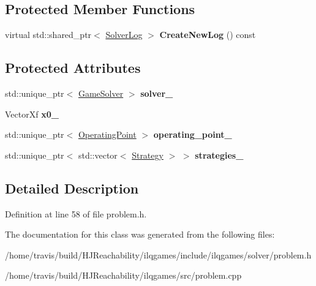 \subsection*{Protected Member Functions}
\begin{DoxyCompactItemize}
\item 
virtual std\+::shared\+\_\+ptr$<$ \hyperlink{classilqgames_1_1_solver_log}{Solver\+Log} $>$ {\bfseries Create\+New\+Log} () const \hypertarget{classilqgames_1_1_problem_a13d87495e055335f3da703909c435217}{}\label{classilqgames_1_1_problem_a13d87495e055335f3da703909c435217}

\end{DoxyCompactItemize}
\subsection*{Protected Attributes}
\begin{DoxyCompactItemize}
\item 
std\+::unique\+\_\+ptr$<$ \hyperlink{classilqgames_1_1_game_solver}{Game\+Solver} $>$ {\bfseries solver\+\_\+}\hypertarget{classilqgames_1_1_problem_aa14af0e2e063c99eefefd029d69dbf0d}{}\label{classilqgames_1_1_problem_aa14af0e2e063c99eefefd029d69dbf0d}

\item 
Vector\+Xf {\bfseries x0\+\_\+}\hypertarget{classilqgames_1_1_problem_a41236f0dfbc5eb6b1ddd08a5cc6555b3}{}\label{classilqgames_1_1_problem_a41236f0dfbc5eb6b1ddd08a5cc6555b3}

\item 
std\+::unique\+\_\+ptr$<$ \hyperlink{structilqgames_1_1_operating_point}{Operating\+Point} $>$ {\bfseries operating\+\_\+point\+\_\+}\hypertarget{classilqgames_1_1_problem_a2bb96299dbdc82440d6b90865ee9b2c1}{}\label{classilqgames_1_1_problem_a2bb96299dbdc82440d6b90865ee9b2c1}

\item 
std\+::unique\+\_\+ptr$<$ std\+::vector$<$ \hyperlink{structilqgames_1_1_strategy}{Strategy} $>$ $>$ {\bfseries strategies\+\_\+}\hypertarget{classilqgames_1_1_problem_a305d33a1e20a8ae63c0c581d562c7a64}{}\label{classilqgames_1_1_problem_a305d33a1e20a8ae63c0c581d562c7a64}

\end{DoxyCompactItemize}


\subsection{Detailed Description}


Definition at line 58 of file problem.\+h.



The documentation for this class was generated from the following files\+:\begin{DoxyCompactItemize}
\item 
/home/travis/build/\+H\+J\+Reachability/ilqgames/include/ilqgames/solver/problem.\+h\item 
/home/travis/build/\+H\+J\+Reachability/ilqgames/src/problem.\+cpp\end{DoxyCompactItemize}
